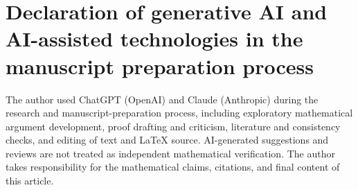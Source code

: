 \section*{Declaration of generative AI and AI-assisted technologies in the manuscript preparation process}
The author used ChatGPT (OpenAI) and Claude (Anthropic) during the research
and manuscript-preparation process, including exploratory mathematical
argument development, proof drafting and criticism, literature and
consistency checks, and editing of text and LaTeX source.
AI-generated suggestions and reviews are not treated as independent
mathematical verification. The author takes responsibility for the
mathematical claims, citations, and final content of this article.

\appendix
